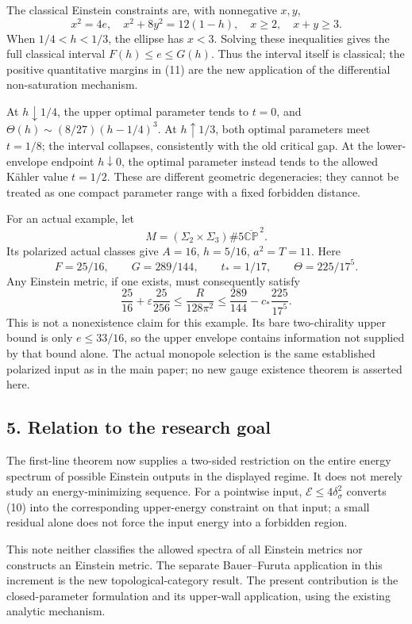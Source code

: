 \documentclass[
  10pt,
]{article}
\begin{document}
The classical Einstein constraints are, with nonnegative \(x,y\), \[
 x^2=4e,\quad x^2+8y^2=12(1-h),\quad x\ge2,\quad x+y\ge3.
\] When \(1/4<h<1/3\), the ellipse has \(x<3\). Solving these
inequalities gives the full classical interval \(F(h)\le e\le G(h)\).
Thus the interval itself is classical; the positive quantitative margins
in (11) are the new application of the differential non-saturation
mechanism.

At \(h\downarrow1/4\), the upper optimal parameter tends to \(t=0\), and
\(\Theta(h)\sim(8/27)(h-1/4)^3\). At \(h\uparrow1/3\), both optimal
parameters meet \(t=1/8\); the interval collapses, consistently with the
old critical gap. At the lower-envelope endpoint \(h\downarrow0\), the
optimal parameter instead tends to the allowed Kähler value \(t=1/2\).
These are different geometric degeneracies; they cannot be treated as
one compact parameter range with a fixed forbidden distance.

For an actual example, let \[
 M=(\Sigma_2\times\Sigma_3)\#5\overline{\mathbb{CP}}^{\,2}.
\] Its polarized actual classes give \(A=16\), \(h=5/16\), \(a^2=T=11\).
Here \[
 F=25/16,\qquad G=289/144,\qquad t_*=1/17,
 \qquad \Theta=225/17^5.
\] Any Einstein metric, if one exists, must consequently satisfy \[
 \frac{25}{16}+\varepsilon\frac{25}{256}
 \le\frac{R}{128\pi^2}
 \le\frac{289}{144}-c_*\frac{225}{17^5}.                 \tag{16}
\] This is not a nonexistence claim for this example. Its bare
two-chirality upper bound is only \(e\le33/16\), so the upper envelope
contains information not supplied by that bound alone. The actual
monopole selection is the same established polarized input as in the
main paper; no new gauge existence theorem is asserted here.

\hypertarget{relation-to-the-research-goal}{%
\subsection{5. Relation to the research
goal}\label{relation-to-the-research-goal}}

The first-line theorem now supplies a two-sided restriction on the
entire energy spectrum of possible Einstein outputs in the displayed
regime. It does not merely study an energy-minimizing sequence. For a
pointwise input, \(\mathcal E\le4\delta_\sigma^2\) converts (10) into
the corresponding upper-energy constraint on that input; a small
residual alone does not force the input energy into a forbidden region.

This note neither classifies the allowed spectra of all Einstein metrics
nor constructs an Einstein metric. The separate Bauer--Furuta
application in this increment is the new topological-category result.
The present contribution is the closed-parameter formulation and its
upper-wall application, using the existing analytic mechanism.
\end{document}
